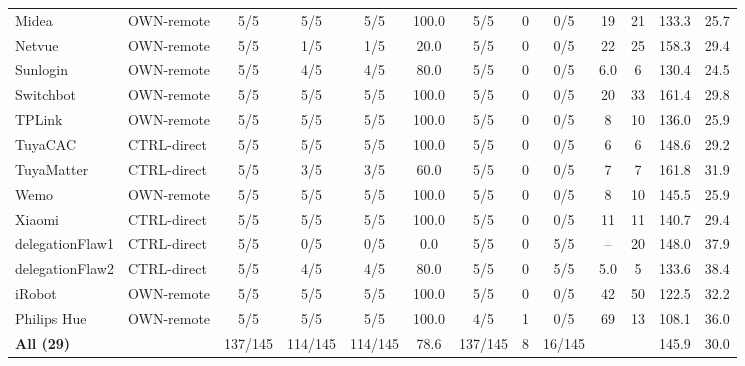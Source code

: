 \begin{table}[t]
\begin{tabular*}{\linewidth}{@{\extracolsep{\fill}} ll ccccc ccc cc @{}}
Midea & OWN-remote & 5/5 & 5/5 & 5/5 & 100.0 & 5/5 & 0 & 0/5 & 19 & 21 & 133.3 & 25.7 \\
Netvue & OWN-remote & 5/5 & 1/5 & 1/5 & 20.0 & 5/5 & 0 & 0/5 & 22 & 25 & 158.3 & 29.4 \\
Sunlogin & OWN-remote & 5/5 & 4/5 & 4/5 & 80.0 & 5/5 & 0 & 0/5 & 6.0 & 6 & 130.4 & 24.5 \\
Switchbot & OWN-remote & 5/5 & 5/5 & 5/5 & 100.0 & 5/5 & 0 & 0/5 & 20 & 33 & 161.4 & 29.8 \\
TPLink & OWN-remote & 5/5 & 5/5 & 5/5 & 100.0 & 5/5 & 0 & 0/5 & 8 & 10 & 136.0 & 25.9 \\
TuyaCAC & CTRL-direct & 5/5 & 5/5 & 5/5 & 100.0 & 5/5 & 0 & 0/5 & 6 & 6 & 148.6 & 29.2 \\
TuyaMatter & CTRL-direct & 5/5 & 3/5 & 3/5 & 60.0 & 5/5 & 0 & 0/5 & 7 & 7 & 161.8 & 31.9 \\
Wemo & OWN-remote & 5/5 & 5/5 & 5/5 & 100.0 & 5/5 & 0 & 0/5 & 8 & 10 & 145.5 & 25.9 \\
Xiaomi & CTRL-direct & 5/5 & 5/5 & 5/5 & 100.0 & 5/5 & 0 & 0/5 & 11 & 11 & 140.7 & 29.4 \\
delegationFlaw1 & CTRL-direct & 5/5 & 0/5 & 0/5 & 0.0 & 5/5 & 0 & 5/5 & -- & 20 & 148.0 & 37.9 \\
delegationFlaw2 & CTRL-direct & 5/5 & 4/5 & 4/5 & 80.0 & 5/5 & 0 & 5/5 & 5.0 & 5 & 133.6 & 38.4 \\
iRobot & OWN-remote & 5/5 & 5/5 & 5/5 & 100.0 & 5/5 & 0 & 0/5 & 42 & 50 & 122.5 & 32.2 \\
Philips Hue & OWN-remote & 5/5 & 5/5 & 5/5 & 100.0 & 4/5 & 1 & 0/5 & 69 & 13 & 108.1 & 36.0 \\
\hline
\textbf{All (29)} &  & 137/145 & 114/145 & 114/145 & 78.6 & 137/145 & 8 & 16/145 &  &  & 145.9 & 30.0 \\
\hline\hline
\end{tabular*}
\end{table}
